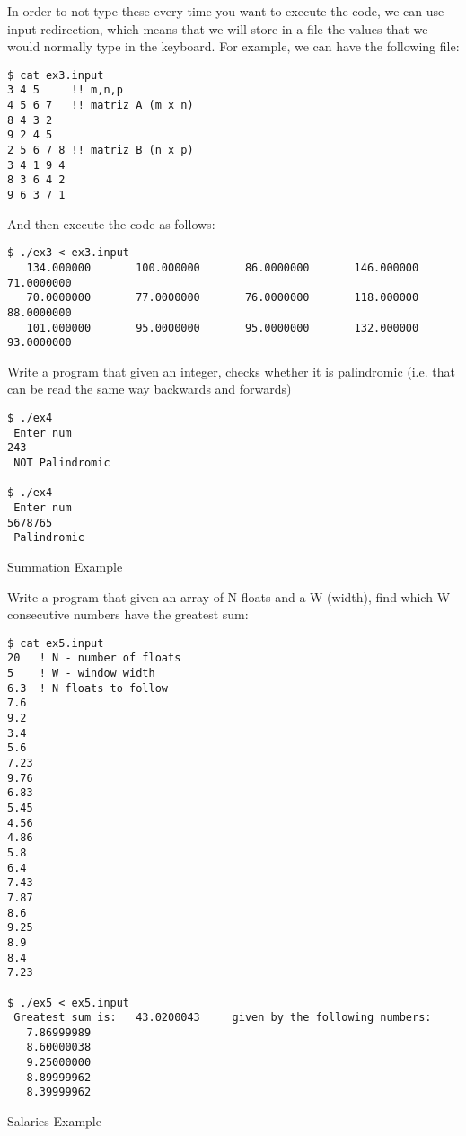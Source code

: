 In order to not type these every time you want to execute the code, we can use
input redirection, which means that we will store in a file the values that we would
normally type in the keyboard. For example, we can have the following file:

\begin{verbatim}
$ cat ex3.input
3 4 5     !! m,n,p
4 5 6 7   !! matriz A (m x n)
8 4 3 2
9 2 4 5
2 5 6 7 8 !! matriz B (n x p)
3 4 1 9 4
8 3 6 4 2
9 6 3 7 1
\end{verbatim}

And then execute the code as follows:

\begin{verbatim}
$ ./ex3 < ex3.input
   134.000000       100.000000       86.0000000       146.000000       71.0000000    
   70.0000000       77.0000000       76.0000000       118.000000       88.0000000    
   101.000000       95.0000000       95.0000000       132.000000       93.0000000
\end{verbatim}

 {Write a program that given an integer, checks whether it is
  palindromic (i.e. that can be read the same way backwards and forwards)}

\begin{verbatim}
$ ./ex4
 Enter num
243
 NOT Palindromic

$ ./ex4
 Enter num
5678765
 Palindromic
\end{verbatim}

 {Summation Example}

Write a program that given an array of N floats and a W (width), find which W
consecutive numbers have the greatest sum:

\begin{verbatim}
$ cat ex5.input
20   ! N - number of floats
5    ! W - window width
6.3  ! N floats to follow
7.6 
9.2 
3.4 
5.6 
7.23 
9.76 
6.83 
5.45 
4.56
4.86 
5.8 
6.4 
7.43 
7.87 
8.6 
9.25 
8.9 
8.4 
7.23

$ ./ex5 < ex5.input
 Greatest sum is:   43.0200043     given by the following numbers:
   7.86999989    
   8.60000038    
   9.25000000    
   8.89999962    
   8.39999962    
\end{verbatim}

 {Salaries Example}

